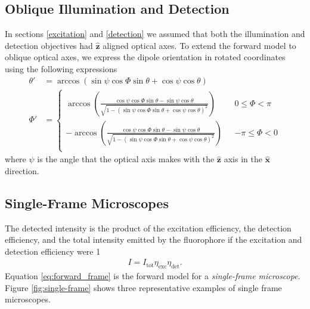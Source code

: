\documentclass[10pt]{article}
\providecommand{\mh}[1]{\mathbf{\hat{#1}}}
\begin{document}
\subsection{Oblique Illumination and Detection}\label{oblique}
In sections \ref{excitation} and \ref{detection} we assumed that both the
illumination and detection objectives had $\mh{z}$ aligned optical axes. To extend
the forward model to oblique optical axes, we express the dipole orientation in
rotated coordinates using the following expressions
\begin{align}
    \theta' &= \arccos\left(\sin\psi\cos\Phi\sin\theta + \cos\psi\cos\theta\right)\label{eq:thetap}\\
  \Phi' &=
          \begin{cases}
            \arccos\left(\frac{\cos\psi\cos\Phi\sin\theta - \sin\psi\cos\theta}{\sqrt{1 - (\sin\psi\cos\Phi\sin\theta + \cos\psi\cos\theta)^2}}\right) \ \ \ &0 \leq \Phi < \pi  \\
            -\arccos\left(\frac{\cos\psi\cos\Phi\sin\theta - \sin\psi\cos\theta}{\sqrt{1 - (\sin\psi\cos\Phi\sin\theta + \cos\psi\cos\theta)^2}}\right) \ \ \ &-\pi \leq \Phi < 0\\
          \end{cases}
\end{align}
where $\psi$ is the angle that the optical axis makes with the $\mh{z}$ axis in
the $\mh{x}$ direction. 

\subsection{Single-Frame Microscopes}\label{forward}
The detected intensity is the product of the excitation efficiency, the
detection efficiency, and the total intensity emitted by the fluorophore if the
excitation and detection efficiency were 1 
\begin{align}
  I = I_{\text{tot}}\eta_{\text{exc}}\eta_{\text{det}}\label{eq:forward_frame}.
\end{align}
Equation \ref{eq:forward_frame} is the forward model for a \emph{single-frame
  microscope}. Figure \ref{fig:single-frame} shows three representative examples of
single frame microscopes. 
\end{document}
